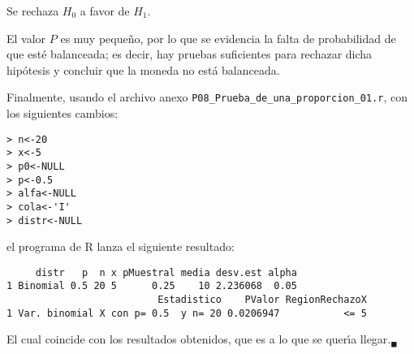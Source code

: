 \begin{solucion}
 \begin{decision}
  Se rechaza $H_0$ a favor de $H_1$.
 \end{decision}

 \begin{conclusion}
  El valor $P$ es muy peque\~no, por lo que se evidencia la falta de probabilidad
  de que est\'e balanceada; es decir, hay pruebas suficientes para rechazar dicha
  hip\'otesis y concluir que la moneda no est\'a balanceada.
 \end{conclusion}
 Finalmente, usando el archivo anexo \texttt{P08\_Prueba\_de\_una\_proporcion\_01.r},
 con los siguientes cambios:
 \begin{verbatim}
> n<-20
> x<-5
> p0<-NULL
> p<-0.5
> alfa<-NULL
> cola<-'I'
> distr<-NULL
 \end{verbatim}
 \vspace{-0.5cm}
 el programa de R lanza el siguiente resultado:
 \begin{verbatim}
     distr   p  n x pMuestral media desv.est alpha
1 Binomial 0.5 20 5      0.25    10 2.236068  0.05
                          Estadistico    PValor RegionRechazoX
1 Var. binomial X con p= 0.5  y n= 20 0.0206947           <= 5
 \end{verbatim}
 \vspace{-0.5cm}
 El cual coincide con los resultados obtenidos,
 que es a lo que se quer\'{\i}a llegar.${}_{\blacksquare}$
\end{solucion}
